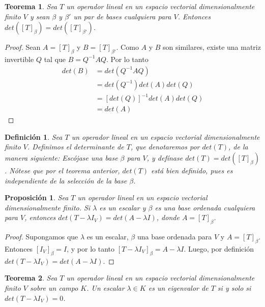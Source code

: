 \documentclass{book}
\newtheorem{theorem}{Teorema}
\newtheorem{proposition}{Proposición}
\newtheorem{definition}{Definición}
\begin{document}
\begin{theorem}
Sea $T$ un operador lineal en un espacio vectorial dimensionalmente finito $V$ y sean $\beta$ y $\beta '$ un par de bases cualquiera para $V$. Entonces $det([T]_{\beta})=det([T]_{\beta '})$.
\end{theorem}

\begin{proof}
Sean $A=[T]_{\beta}$ y $B=[T]_{\beta '}$. Como $A$ y $B$ son similares, existe una matriz invertible $Q$ tal que $B=Q^{-1}AQ$. Por lo tanto
\[
\begin{split}
det(B) &= det(Q^{-1}AQ) \\
&= det(Q^{-1})det(A)det(Q) \\
&= [det(Q)]^{-1}det(A)det(Q) \\
&= det(A)
\end{split}
\]
\end{proof}

\begin{definition}
Sea $T$ un operador lineal en un espacio vectorial dimensionalmente finito $V$. Definimos el determinante de $T$, que denotaremos por $det(T)$, de la manera siguiente: Escójase una base $\beta$ para $V$, y defínase $det(T)=det([T]_{\beta})$. Nótese que por el teorema anterior, $det(T)$ está bien definido, pues es independiente de la selección de la base $\beta$.
\end{definition}

\begin{proposition}
Sea $T$ un operador lineal en un espacio vectorial dimensionalmente finito. Si $\lambda$ es un escalar y $\beta$ es una base ordenada cualquiera para $V$, entonces $det(T-\lambda I_{V})=det(A-\lambda I)$, donde $A=[T]_{\beta}$.
\end{proposition}

\begin{proof}
Supongamos que $\lambda$ es un escalar, $\beta$ una base ordenada para $V$ y $A=[T]_{\beta}$. Entonces $[I_{V}]_{\beta}=I$, y por lo tanto $[T-\lambda I_{V}]_{\beta}=A-\lambda I$. Luego, por definición $det(T-\lambda I_{V})=det(A-\lambda I)$.
\end{proof}

\begin{theorem}
Sea $T$ un operador lineal en un espacio vectorial dimensionalmente finito $V$ sobre un campo $K$. Un escalar $\lambda \in K$ es un eigenvalor de $T$ si y solo si $det(T-\lambda I_{V})=0$.

\end{theorem}
\end{document}
